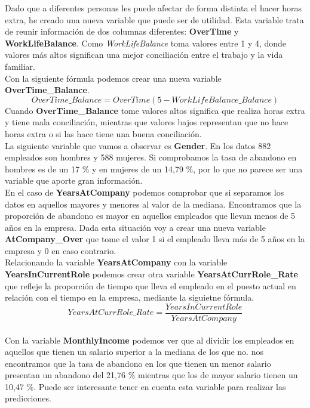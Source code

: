 Dado que a diferentes personas les puede afectar de forma distinta el hacer horas extra, he creado una nueva variable que puede ser de utilidad.
Esta variable trata de reunir información de dos columnas diferentes: \textbf{OverTime} y \textbf{WorkLifeBalance}. 
Como \textit{WorkLifeBalance} toma valores entre 1 y 4, donde valores más altos significan una mejor conciliación entre el trabajo y la vida familiar.\\

Con la siguiente fórmula podemos crear una nueva variable \textbf{OverTime\_Balance}. 
\[ \mathit{OverTime\_Balance} = \mathit{OverTime} (5-\mathit{WorkLifeBalance\_Balance})\]
Cuando \textbf{OverTime\_Balance} tome valores altos significa que realiza horas extra y tiene mala conciliación, mientras que valores bajos representan que no hace horas extra o si las hace tiene una buena conciliación.\\


La siguiente variable que vamos a observar es \textbf{Gender}. En los datos 882 empleados son hombres y 588 mujeres.
Si comprobamos la tasa de abandono en hombres es de un 17 \% y en mujeres de un 14,79 \%, por lo que no parece ser una variable que aporte gran información.\\


En el caso de \textbf{YearsAtCompany} podemos comprobar que si separamos los datos en aquellos mayores y menores al valor de la mediana.
Encontramos que la proporción de abandono es mayor en aquellos empleados que llevan menos de 5 años en la empresa.
Dada esta situación voy a crear una nueva variable \textbf{AtCompany\_Over} que tome el valor 1 si el empleado lleva más de 5 años en la empresa y 0 en caso contrario.\\

Relacionando la variable \textbf{YearsAtCompany} con la variable \textbf{YearsInCurrentRole} podemos crear otra variable \textbf{YearsAtCurrRole\_Rate} que refleje
la proporción de tiempo que lleva el empleado en el puesto actual en relación con el tiempo en la empresa, mediante la siguietne fórmula.\\

\[ \mathit{YearsAtCurrRole\_Rate} = \frac{\mathit{YearsInCurrentRole}}{\mathit{YearsAtCompany}}\]
\\

Con la variable \textbf{MonthlyIncome} podemos ver que al dividir los empleados en aquellos que tienen un salario superior a la mediana de los que no. nos encontramos que la tasa de abandono en los que tienen un menor salario presentan un abandono del 21,76 \% mientras que los de mayor salario tienen un 10,47 \%. Puede ser interesante tener en cuenta esta variable para realizar las predicciones.\\


